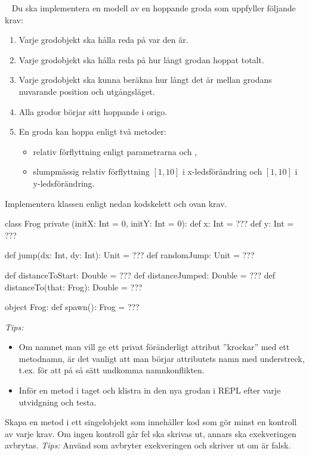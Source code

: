 \Task  \what~  Du ska implementera en modell av en hoppande groda som uppfyller följande krav:
\begin{enumerate}%
\item Varje grodobjekt ska hålla reda på var den är.
\item Varje grodobjekt ska hålla reda på hur långt grodan hoppat totalt.
\item Varje grodobjekt ska kunna beräkna hur långt det är mellan grodans nuvarande position och utgångsläget.
\item Alla grodor börjar sitt hoppande i origo.
\item En groda kan hoppa enligt två metoder:
  \begin{itemize} [nolistsep, noitemsep]
  \item relativ förflyttning enligt parametrarna  och ,
  \item slumpmässig relativ förflyttning $[1, 10]$ i x-ledsförändring och $[1, 10]$ i y-ledsförändring.
  \end{itemize}
\end{enumerate}

\Subtask Implementera klassen  enligt nedan kodskelett och ovan krav.

\begin{Code}
class Frog private (initX: Int = 0, initY: Int = 0):
  def x: Int = ???
  def y: Int = ???

  def jump(dx: Int, dy: Int): Unit = ???
  def randomJump: Unit = ???

  def distanceToStart: Double = ???
  def distanceJumped: Double = ???
  def distanceTo(that: Frog): Double = ???

object Frog:
  def spawn(): Frog = ???
\end{Code}
\emph{Tips:}
\begin{itemize} [nolistsep, noitemsep]
\item Om namnet man vill ge ett privat föränderligt attribut ''krockar'' med ett metodnamn, är det vanligt att man börjar attributets namn med understreck, t.ex.  för att på så sätt undkomma namnkonflikten.
\item Inför en metod i taget och klistra in den nya grodan i REPL efter varje utvidgning och testa.
\end{itemize}



\Subtask Skapa en metod  i ett singelobjekt  som innehåller kod som gör minst en kontroll av varje krav. Om ingen kontroll går fel ska  skrivas ut, annars ska exekveringen avbrytas. \emph{Tips:} Använd  som avbryter exekveringen och skriver ut  om  är falsk.

